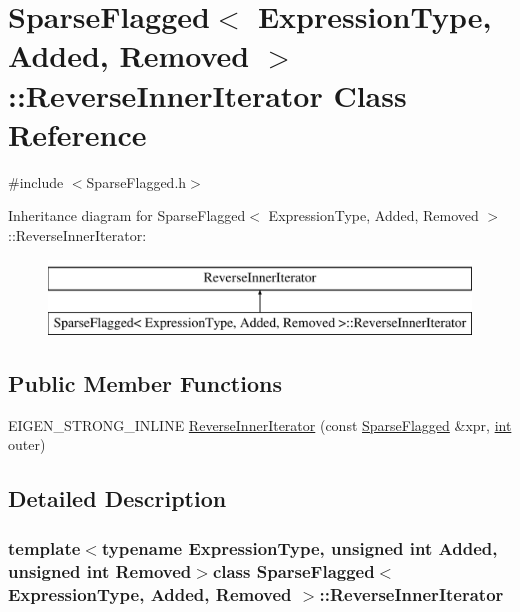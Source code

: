 \hypertarget{class_sparse_flagged_1_1_reverse_inner_iterator}{\section{Sparse\-Flagged$<$ Expression\-Type, Added, Removed $>$\-:\-:Reverse\-Inner\-Iterator Class Reference}
\label{class_sparse_flagged_1_1_reverse_inner_iterator}
}


{\ttfamily \#include $<$Sparse\-Flagged.\-h$>$}

Inheritance diagram for Sparse\-Flagged$<$ Expression\-Type, Added, Removed $>$\-:\-:Reverse\-Inner\-Iterator\-:\begin{figure}[H]
\begin{center}
\leavevmode
\includegraphics[height=2.000000cm]{class_sparse_flagged_1_1_reverse_inner_iterator}
\end{center}
\end{figure}
\subsection*{Public Member Functions}
\begin{DoxyCompactItemize}
\item 
E\-I\-G\-E\-N\-\_\-\-S\-T\-R\-O\-N\-G\-\_\-\-I\-N\-L\-I\-N\-E \hyperlink{class_sparse_flagged_1_1_reverse_inner_iterator_ab4ca4a37504900fdf4e5d84f5764feef}{Reverse\-Inner\-Iterator} (const \hyperlink{class_sparse_flagged}{Sparse\-Flagged} \&xpr, \hyperlink{ioapi_8h_a787fa3cf048117ba7123753c1e74fcd6}{int} outer)
\end{DoxyCompactItemize}


\subsection{Detailed Description}
\subsubsection*{template$<$typename Expression\-Type, unsigned int Added, unsigned int Removed$>$class Sparse\-Flagged$<$ Expression\-Type, Added, Removed $>$\-::\-Reverse\-Inner\-Iterator}



